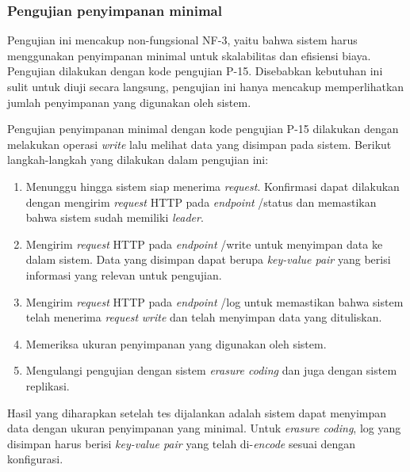 \subsubsection{Pengujian penyimpanan minimal}
\label{subsubsection:pengujian-penyimpanan-minimal}

Pengujian ini mencakup non-fungsional NF-3, yaitu bahwa sistem harus menggunakan penyimpanan minimal untuk skalabilitas dan efisiensi biaya. Pengujian dilakukan dengan kode pengujian P-15. Disebabkan kebutuhan ini sulit untuk diuji secara langsung, pengujian ini hanya mencakup memperlihatkan jumlah penyimpanan yang digunakan oleh sistem.

Pengujian penyimpanan minimal dengan kode pengujian P-15 dilakukan dengan melakukan operasi \textit{write} lalu melihat data yang disimpan pada sistem. Berikut langkah-langkah yang dilakukan dalam pengujian ini:

\begin{enumerate}
	\item Menunggu hingga sistem siap menerima \textit{request}. Konfirmasi dapat dilakukan dengan mengirim \textit{request} HTTP pada \textit{endpoint} /status dan memastikan bahwa sistem sudah memiliki \textit{leader}.
	\item Mengirim \textit{request} HTTP pada \textit{endpoint} /write untuk menyimpan data ke dalam sistem. Data yang disimpan dapat berupa \textit{key-value pair} yang berisi informasi yang relevan untuk pengujian.
	\item Mengirim \textit{request} HTTP pada \textit{endpoint} /log untuk memastikan bahwa sistem telah menerima \textit{request} \textit{write} dan telah menyimpan data yang dituliskan.
	\item Memeriksa ukuran penyimpanan yang digunakan oleh sistem.
	\item Mengulangi pengujian dengan sistem \textit{erasure coding} dan juga dengan sistem replikasi.
\end{enumerate}

Hasil yang diharapkan setelah tes dijalankan adalah sistem dapat menyimpan data dengan ukuran penyimpanan yang minimal. Untuk \textit{erasure coding}, log yang disimpan harus berisi \textit{key-value pair} yang telah di-\textit{encode} sesuai dengan konfigurasi.